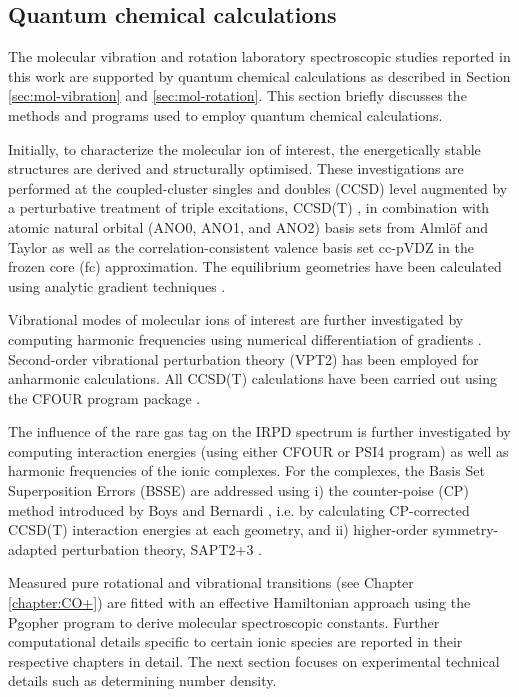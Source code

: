\subsection{Quantum chemical calculations}
\label{sec:QC-calculations}
The molecular vibration and rotation laboratory spectroscopic studies reported in this work are supported by quantum chemical calculations as described in Section \ref{sec:mol-vibration} and \ref{sec:mol-rotation}. This section briefly discusses the methods and programs used to employ quantum chemical calculations.

Initially, to characterize the molecular ion of interest, the energetically stable structures are derived and structurally optimised. These investigations are performed at the coupled-cluster singles and doubles (CCSD) level augmented by a perturbative treatment of triple excitations, CCSD(T) \cite{raghavachari_fifth-order_1989}, in combination with atomic natural orbital (ANO0, ANO1, and ANO2) basis sets from Alml\"of and Taylor \cite{almlof_general_1987, almlof_atomic_1991} as well as the correlation-consistent valence basis set cc-pVDZ \cite{dunning_gaussian_1989} in the frozen core (fc) approximation. The equilibrium geometries have been calculated using analytic gradient techniques  \cite{watts_open-shell_1992}.

Vibrational modes of molecular ions of interest are further investigated by computing harmonic frequencies using numerical differentiation of gradients \cite{lee_analytic_1991, watts_coupledcluster_1993}. Second-order vibrational perturbation theory (VPT2) \cite{mills_32_1972} has been employed for anharmonic calculations. All CCSD(T) calculations have been carried out using the CFOUR program package  \cite{matthews_coupled-cluster_2020,harding_parallel_2008}.

The influence of the rare gas tag on the IRPD spectrum is further investigated by computing interaction energies (using either CFOUR \cite{matthews_coupled-cluster_2020} or PSI4 \cite{smith_psi4_2020} program) as well as harmonic frequencies of the ionic complexes. For the complexes, the Basis Set Superposition Errors (BSSE) \cite{liu_accurate_1973} are addressed using i) the counter-poise (CP) method introduced by Boys and Bernardi \cite{boys_calculation_1970}, i.e. by calculating CP-corrected CCSD(T) interaction energies at each geometry, and ii) higher-order symmetry-adapted perturbation theory, SAPT2+3 \cite{jeziorski_perturbation_1994, hohenstein_density_2010}. 

Measured pure rotational and vibrational transitions (see Chapter \ref{chapter:CO+}) are fitted with an effective Hamiltonian approach using the Pgopher program \cite{western_pgopher_2017} to derive molecular spectroscopic constants. Further computational details specific to certain ionic species are reported in their respective chapters in detail. The next section focuses on experimental technical details such as determining number density.
